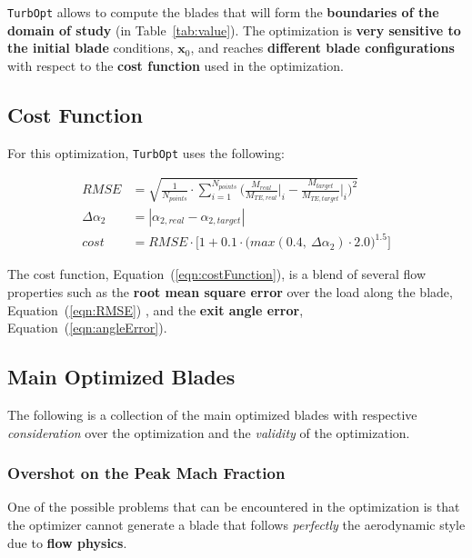 \texttt{TurbOpt} allows to compute the blades that will form the \textbf{boundaries of the domain of study} (in Table~\ref{tab:value}).
The optimization is \textbf{very sensitive to the initial blade} conditions, $\boldsymbol{x}_0$, and reaches \textbf{different blade configurations} with respect to the \textbf{cost function} used in the optimization.

\subsection{Cost Function}

For this optimization, \texttt{TurbOpt} uses the following:

\begin{align}
    RMSE            & = \sqrt{\frac{1}{N_{points}} \cdot \sum_{i = 1}^{N_{points}} \Bigg( \frac{M_{real}}{M_{TE, real}} \Bigg|_{i} - \frac{M_{target}}{M_{TE, target}} \Bigg|_{i} \Bigg)^2} 
    \label{eqn:RMSE} \\ 
    \Delta \alpha_2 & = | \alpha_{2, real} - \alpha_{2, target} | 
    \label{eqn:angleError} \\
    cost            & = RMSE \cdot \Big[ 1 + 0.1 \cdot \Big( max(0.4, \ \Delta \alpha_2) \cdot 2.0 \Big)^{1.5} \Big]
    \label{eqn:costFunction}
\end{align}

The cost function, Equation~(\ref{eqn:costFunction}), is a blend of several flow properties such as the \textbf{root mean square error} over the load along the blade, Equation~(\ref{eqn:RMSE}) , and the \textbf{exit angle error}, Equation~(\ref{eqn:angleError}). 

\subsection{Main Optimized Blades}

The following is a collection of the main optimized blades with respective \textit{consideration} over the optimization and the \textit{validity} of the optimization.

\subsubsection{Overshot on the Peak Mach Fraction}

One of the possible problems that can be encountered in the optimization is that the optimizer cannot generate a blade that follows \textit{perfectly} the aerodynamic style due to \textbf{flow physics}.

